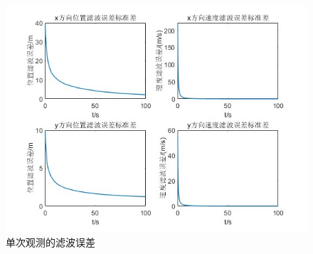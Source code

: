 \documentclass[fontset=windows]{article}
\numberwithin{figure}{section}
\begin{document}
\begin{figure}[H]
    \centering
    \includegraphics[scale=0.9]{4_4.jpg}
    \caption{单次观测的滤波误差}
    \label{4.4}
\end{figure}


\end{document}
